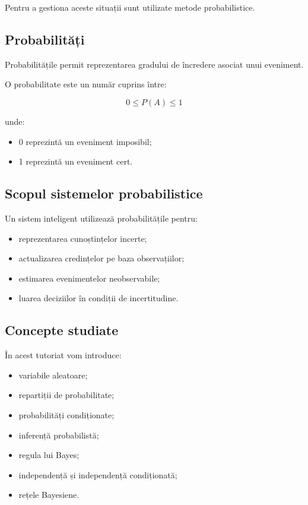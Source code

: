 \documentclass[12pt,a4paper]{article}
\begin{document}
Pentru a gestiona aceste situații sunt utilizate metode probabilistice.

\subsection{Probabilități}

Probabilitățile permit reprezentarea gradului de încredere asociat unui eveniment.

O probabilitate este un număr cuprins între:

\[
0 \leq P(A) \leq 1
\]

unde:

\begin{itemize}
\item 0 reprezintă un eveniment imposibil;
\item 1 reprezintă un eveniment cert.
\end{itemize}

\subsection{Scopul sistemelor probabilistice}

Un sistem inteligent utilizează probabilitățile pentru:

\begin{itemize}
\item reprezentarea cunoștințelor incerte;
\item actualizarea credințelor pe baza observațiilor;
\item estimarea evenimentelor neobservabile;
\item luarea deciziilor în condiții de incertitudine.
\end{itemize}

\subsection{Concepte studiate}

În acest tutoriat vom introduce:

\begin{itemize}
\item variabile aleatoare;
\item repartiții de probabilitate;
\item probabilități condiționate;
\item inferență probabilistă;
\item regula lui Bayes;
\item independență și independență condiționată;
\item rețele Bayesiene.
\end{itemize}
\end{document}
